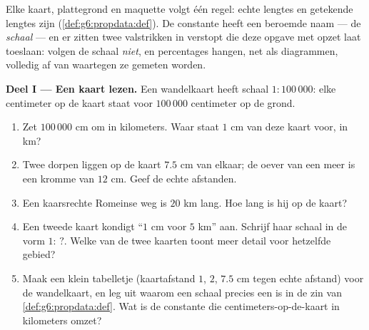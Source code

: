 \begin{problem}
\label{pb:g6:propdata:1}
Elke kaart, plattegrond en maquette volgt één regel: echte lengtes en getekende
lengtes zijn \emph{} (\cref{def:g6:propdata:def}). De constante heeft
een beroemde naam --- de \emph{schaal} --- en er zitten twee
valstrikken in verstopt die deze opgave met opzet laat toeslaan: 
volgen de schaal \emph{niet}, en percentages hangen, net als diagrammen,
volledig af van waartegen ze gemeten worden.

\medskip
\noindent\textbf{Deel I --- Een kaart lezen.}
Een wandelkaart heeft schaal $1:100\,000$: elke centimeter op de kaart staat
voor $100\,000$ centimeter op de grond.
\begin{enumerate}
  \item Zet $100\,000$ cm om in kilometers. Waar staat $1$ cm van deze kaart
        voor, in km?
  \item Twee dorpen liggen op de kaart $7.5$ cm van elkaar; de oever van een
        meer is een kromme van $12$ cm. Geef de echte afstanden.
  \item Een kaarsrechte Romeinse weg is $20$ km lang. Hoe lang is hij op de
        kaart?
  \item Een tweede kaart kondigt ``$1$ cm voor $5$ km'' aan. Schrijf haar schaal
        in de vorm $1: \,?$. Welke van de twee kaarten toont meer detail voor
        hetzelfde gebied?
  \item Maak een klein tabelletje (kaartafstand $1$, $2$, $7.5$ cm tegen echte
        afstand) voor de wandelkaart, en leg uit waarom een schaal precies een
         is in de zin van \cref{def:g6:propdata:def}. Wat is de
        constante die centimeters-op-de-kaart in kilometers omzet?
\end{enumerate}


\end{problem}
